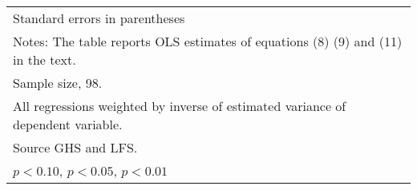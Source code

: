 \begin{table}[htbp]
\begin{tabular}{l*{3}{c}}
\bottomrule
\multicolumn{4}{l}{\footnotesize Standard errors in parentheses}\\
\multicolumn{4}{l}{\footnotesize Notes: The table reports OLS estimates of equations (8) (9) and (11) in the text.}\\
\multicolumn{4}{l}{\footnotesize Sample size, 98.}\\
\multicolumn{4}{l}{\footnotesize All regressions weighted by inverse of estimated variance of dependent variable.}\\
\multicolumn{4}{l}{\footnotesize Source GHS and LFS.}\\
\multicolumn{4}{l}{\footnotesize \sym{*} \(p<0.10\), \sym{**} \(p<0.05\), \sym{***} \(p<0.01\)}\\
\end{tabular}
\end{table}
